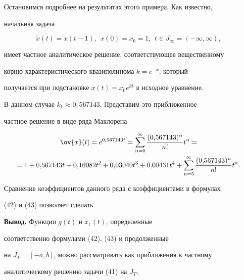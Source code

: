 Остановимся подробнее на результатах этого примера. Как известно,


начальная задача


$$


\Dot{x}(t)=x(t-1),\ \  x(0)=x_0=1,\ \


t\in J_{\infty}=(-\infty,\infty),


$$


имеет частное аналитическое решение, соответствующее вещественному


корню характеристического квазиполинома $k=e^{-k}$, который


получается при подстановке $x(t)=x_0e^{kt}$ в исходное уравнение.


В данном случае $k_1\approx 0{,}567143$. Представим это приближенное 


частное решение в виде ряда Маклорена


\begin{multline*}


\ov{x}(t)=e^{0{,}567143t}=\sum_{n=0}^{\infty}


\frac{(0{,}567143)^n}{n!}t^n= \\


%


=1+0{,}567143t+0{,}16082t^2+0{,}03040t^3+0{,}00431t^4+


\sum_{n=5}^{\infty}\frac{(0{,}567143)^n}{n!}t^n.


\end{multline*}


Сравнение коэффициентов данного ряда с коэффициентами в формулах


(42) и (43) позволяет сделать 


\medskip





{\bf Вывод.} Функции $g(t)$ и $x_1(t)$, определенные 


соответственно формулами (42), (43) и продолженные 


на $J_T=[-a,b]$, можно рассматривать как приближения к частному 


аналитическому решению задачи (41) на $J_T$.








